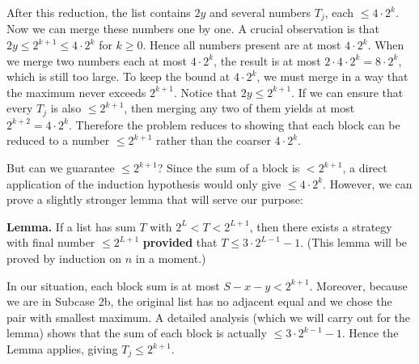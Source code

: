 After this reduction, the list contains \(2y\) and several numbers \(T_j\), each \(\le 4 \cdot 2^{k}\). Now we can merge these numbers one by one. A crucial observation is that \(2y \le 2^{k+1} \le 4 \cdot 2^{k}\) for \(k \ge 0\). Hence all numbers present are at most \(4 \cdot 2^{k}\). When we merge two numbers each at most \(4 \cdot 2^{k}\), the result is at most \(2 \cdot 4 \cdot 2^{k} = 8 \cdot 2^{k}\), which is still too large. To keep the bound at \(4 \cdot 2^{k}\), we must merge in a way that the maximum never exceeds \(2^{k+1}\). Notice that \(2y \le 2^{k+1}\). If we can ensure that every \(T_j\) is also \(\le 2^{k+1}\), then merging any two of them yields at most \(2^{k+2} = 4 \cdot 2^{k}\). Therefore the problem reduces to showing that each block can be reduced to a number \(\le 2^{k+1}\) rather than the coarser \(4 \cdot 2^{k}\).\par
But can we guarantee \(\le 2^{k+1}\)? Since the sum of a block is \(< 2^{k+1}\), a direct application of the induction hypothesis would only give \(\le 4 \cdot 2^{k}\). However, we can prove a slightly stronger lemma that will serve our purpose:\par
\textbf{Lemma.} If a list has sum \(T\) with \(2^{L} < T < 2^{L+1}\), then there exists a strategy with final number \(\le 2^{L+1}\) \textbf{provided} that \(T \le 3 \cdot 2^{L-1} - 1\). (This lemma will be proved by induction on \(n\) in a moment.)\par
In our situation, each block sum is at most \(S - x - y < 2^{k+1}\). Moreover, because we are in Subcase 2b, the original list has no adjacent equal and we chose the pair with smallest maximum. A detailed analysis (which we will carry out for the lemma) shows that the sum of each block is actually \(\le 3 \cdot 2^{k-1} - 1\). Hence the Lemma applies, giving \(T_j \le 2^{k+1}\).\par
